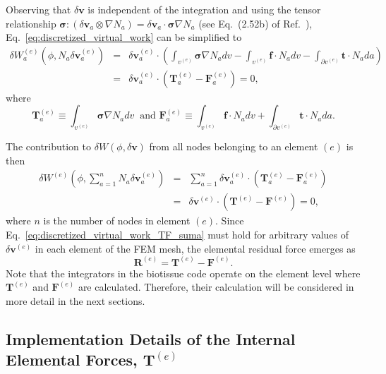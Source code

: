 \documentclass[12pt,aps,pre]{revtex4}
\begin{document}
Observing that $\delta \pmb{v}$ is independent of the integration and using the tensor relationship $\pmb{\sigma}:(\delta \pmb{v}_a \otimes \nabla N_a) = \delta \pmb{v}_a \cdot \pmb{\sigma} \nabla N_a$ (see Eq.\ (2.52b) of Ref.\ ), Eq.\ \eqref{eq:discretized_virtual_work} can be simplified to
%
\begin{eqnarray}
\delta W^{(e)}_a(\phi,N_a\delta\pmb{v}^{(e)}_a) &=& \delta \pmb{v}^{(e)}_a \cdot \left( \int_{v^{(e)}} \pmb{\sigma} \nabla N_a dv - \int_{v^{(e)}} \pmb{f} \cdot N_a dv - \int_{\partial v^{(e)}} \pmb{t} \cdot N_a da \right) \nonumber\\
%
&=& \delta \pmb{v}^{(e)}_a \cdot \left( \pmb{T}^{(e)}_a - \pmb{F}^{(e)}_a \right) = 0,
\label{eq:discretized_virtual_work_TF}
\end{eqnarray}
%
where
%
\begin{equation}
\pmb{T}^{(e)}_a \equiv \int_{v^{(e)}} \pmb{\sigma}\nabla N_a dv \ \text{ and } \pmb{F}^{(e)}_a \equiv \int_{v^{(e)}} \pmb{f} \cdot N_a  dv + \int_{\partial v^{(e)}} \pmb{t} \cdot N_a  da.
\label{eq:TF_definition}
\end{equation}
%

The contribution to $\delta W(\phi,\delta \pmb{v})$ from all nodes belonging to an element $(e)$ is then
%
\begin{eqnarray}
\delta W^{(e)}(\phi,\sum_{a=1}^n N_a \delta\pmb{v}^{(e)}_a) &=& \sum_{a=1}^n\delta \pmb{v}^{(e)}_a \cdot \left( \pmb{T}^{(e)}_a - \pmb{F}^{(e)}_a \right) \nonumber\\
%
&=& \delta \pmb{v}^{(e)} \cdot \left( \pmb{T}^{(e)} - \pmb{F}^{(e)} \right) = 0,
\label{eq:discretized_virtual_work_TF_suma}
\end{eqnarray}
%
where $n$ is the number of nodes in element $(e)$. Since Eq.\ \eqref{eq:discretized_virtual_work_TF_suma} must hold for arbitrary values of $\delta \pmb{v}^{(e)}$ in each element of the FEM mesh, the elemental residual force emerges as
%
\begin{equation}
\pmb{R}^{(e)} = \pmb{T}^{(e)} - \pmb{F}^{(e)}.
\label{eq:R^e}
\end{equation}
%
Note that the integrators in the biotissue code operate on the element level where $\pmb{T}^{(e)}$ and $\pmb{F}^{(e)}$ are calculated. Therefore, their calculation will be considered in more detail in the next sections.

\subsection{Implementation Details of the Internal Elemental Forces, $\pmb{T}^{(e)}$}
\end{document}
